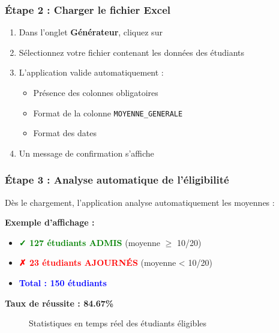 \subsubsection{Étape 2 : Charger le fichier Excel}

\begin{enumerate}[leftmargin=*]
    \item Dans l'onglet \textbf{Générateur}, cliquez sur 
    \item Sélectionnez votre fichier contenant les données des étudiants
    \item L'application valide automatiquement :
    \begin{itemize}
        \item Présence des colonnes obligatoires
        \item Format de la colonne \texttt{MOYENNE\_GENERALE}
        \item Format des dates
    \end{itemize}
    \item Un message de confirmation s'affiche
\end{enumerate}

\subsubsection{Étape 3 : Analyse automatique de l'éligibilité}

Dès le chargement, l'application analyse automatiquement les moyennes :

\begin{tcolorbox}[colback=green!5!white,colframe=green!75!black,title=Statistiques affichées]
\textbf{Exemple d'affichage :}

\begin{itemize}[leftmargin=*]
    \item \textcolor{green}{\textbf{✓ 127 étudiants ADMIS}} (moyenne $\geq$ 10/20)
    \item \textcolor{red}{\textbf{✗ 23 étudiants AJOURNÉS}} (moyenne < 10/20)
    \item \textcolor{blue}{\textbf{Total : 150 étudiants}}
\end{itemize}

\textbf{Taux de réussite : 84.67\%}
\end{tcolorbox}

\begin{figure}[h]
    \centering
    \caption{Statistiques en temps réel des étudiants éligibles}
\end{figure}

